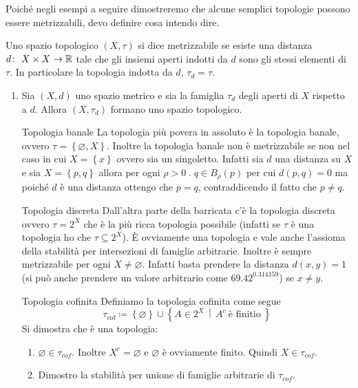 Poiché negli esempi a seguire dimostreremo che alcune semplici topologie possono essere metrizzabili, devo definire cosa intendo dire.
\begin{definition}
	Uno spazio topologico $(X,\tau)$ si dice metrizzabile se esiste una distanza $d \colon\ X\times X \rightarrow \mathbb{R}$ tale che gli insiemi aperti indotti da $d$ sono gli stessi elementi di $\tau$. In particolare la topologia indotta da $d$, $\tau_d  = \tau$. 
\end{definition}

\begin{example}
\begin{enumerate}
	\item Sia $(X,d)$ uno spazio metrico e sia la famiglia $\tau_d$ degli aperti di $X$ rispetto a $d$. Allora $(X,\tau_d)$ formano uno spazio topologico. 
	\item[Topologia banale] La topologia più povera in assoluto è la topologia banale, ovvero $\tau = \left\{\varnothing, X\right\}$. Inoltre la topologia banale non è metrizzabile se non nel caso in cui $X = \left\{x\right\}$ ovvero sia un singoletto. Infatti sia $d$ una distanza su $X$ e sia $X = \left\{p,q\right\}$ allora per ogni $\rho > 0 \; . \; q \in B_\rho(p)$ per cui $d(p,q) = 0$ ma poiché $d$ è una distanza ottengo che $p=q$, contraddicendo il fatto che $p \neq q$. 
	\item[Topologia discreta] Dall'altra parte della barricata c'è la topologia discreta ovvero $\tau = 2^X$ che è la più ricca topologia possibile (infatti se $\tau$ è una topologia ho che $\tau \subseteq 2^X$). È ovviamente una topologia e vale anche l'assioma della stabilità per intersezioni di famiglie arbitrarie. Inoltre è sempre metrizzabile per ogni $X \neq \varnothing$. Infatti basta prendere la distanza $d(x,y) = 1$ (si può anche prendere un valore arbitrario come $69.42^{0.314159}$) se $x \neq y$.
	\item[Topologia cofinita] Definiamo la topologia cofinita come segue 
	\begin{equation*}
		\tau_{\text{cof}} \coloneqq \left\{\varnothing\right\} \cup \left\{ A \in 2^X  \,\middle|\, A^c\ \text{è finitio}\ \right\}
	\end{equation*}
	Si dimostra che è una topologia:
	\begin{enumerate}
		\item $\varnothing \in \tau_{cof}$. Inoltre $X^c = \varnothing$ e $\varnothing$ è ovviamente finito. Quindi $X \in \tau_{cof}$.
		\item Dimostro la stabilità per unione di famiglie arbitrarie di $\tau_{cof}$.

\end{enumerate}
\end{enumerate}
\end{example}

